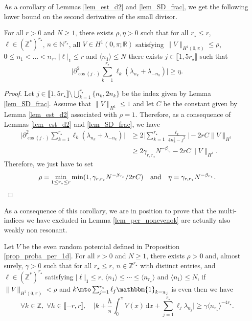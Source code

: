 As a corollary of Lemmas \ref{lem_est_d2} and \ref{lem_SD_frac}, we get the following lower bound on the second derivative of the small divisor.
\begin{corollary} \label{cor_der2}For all $r>0$ and $N\geq 1$, there exists $\rho,\eta>0$ such that for all $r_\star \leq r$, $\ell \in (\mathbb{Z}^*)^{r_\star}$, $n\in \mathbb{N}^{r_\star}$, all $V\in H^1(0,\pi;\mathbb{R})$ satisfying $\|V\|_{H^1(0,\pi)} \leq \rho$, $0\leq n_1 < \dots < n_r$, $|\ell|_{1} \leq r$ and $\langle n_1 \rangle \leq N$ there exists $j\in \llbracket 1,5r_\star \rrbracket$ such that
\[
\biggl| \partial^2_{\cos(j \,\cdot)} \sum_{k=1}^{r_\star} \ell_k (\lambda_{n_k} + \lambda_{-n_k}) \biggr| \geq \eta.
\]
\end{corollary}
\begin{proof} Let $j\in \llbracket 1,5r_\star \rrbracket \setminus \bigcup_{k=1}^{r_\star}\{ n_k,2n_k\}$ be the index given by Lemma \ref{lem_SD_frac}. Assume that $\|V\|_{H^1} \leq 1$ and let $C$ be the constant given by Lemma \ref{lem_est_d2} associated with $\rho=1$. Therefore, as a consequence of Lemmas \ref{lem_est_d2} and \ref{lem_SD_frac}, we have
\begin{equation*}
\begin{split}
\biggl| \partial^2_{\cos(j \,\cdot)} \sum_{k=1}^{r_\star} \ell_k (\lambda_{n_k} + \lambda_{-n_k}) \biggr| &\geq 2\biggl| \sum_{k=1}^{r_\star} \frac{\ell_k}{4n_k^2-j^2} \biggr| - 2 r C \|V\|_{H^1} \\ &\geq 2\gamma_{r,r_\star} N^{-\beta_{r_\star}} - 2 r C \|V\|_{H^1}.
\end{split}
\end{equation*}
Therefore, we just have to set
\[
\rho = \min_{1\leq r_\star \leq r} \min(1, \gamma_{r,r_\star} N^{-\beta_{r_\star}} / 2rC)\quad\text{and}\quad\eta = \gamma_{r,r_\star} N^{-\beta_{r_\star}}.\qedhere
\]
\end{proof}
As a consequence of this corollary, we are in position to prove that the multi-indices we have excluded in Lemma \ref{lem_per_nonevenok} are actually also weakly non resonant.
\begin{lemma}
\label{lem_per_evenok} Let $V$ be the even random potential defined in Proposition \ref{prop_proba_per_1d}. For all $r\!>\!0$ and $N\geq 1$, there exists $\rho\!>\!0$ and, almost surely, $\gamma\!>\!0$ such that for all $r_\star \!\leq\! r$, $n\in \mathbb{Z}^{r_\star}$ with distinct entries, and $\ell \in (\mathbb{Z}^*)^{r_\star}$ satisfying $|\ell|_1 \!\leq\! r$, $\langle n_1 \rangle \!\leq\! \cdots \!\leq\! \langle n_{r_\star} \rangle$ and $\langle n_1 \rangle \!\leq\! N$, if $\| V\|_{H^1(0,\pi)} < \rho$ and $ k \mto \sum_{j=1}^{r_\star} \ell_j \mathbbm{1}_{ k = n_j } $ is even then we have
\[
\forall k\in \mathbb{Z},\; \forall h\in \llbracket -r,r \rrbracket, \quad \biggl|k+\frac{h}\pi \int_0^\pi V(x) \, \mathrm{d}x + \sum_{j=1}^{r_\star} \ell_j \lambda_{n_j}\biggr|\geq \gamma \langle n_{r_\star} \rangle^{-4 r_\star}.
\]
\end{lemma}
